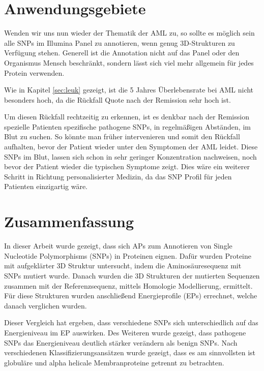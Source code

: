 \section{Anwendungsgebiete}

Wenden wir uns nun wieder der Thematik der \ac{AML} zu, so sollte es möglich sein alle \ac{SNP}s im Illumina Panel zu annotieren, wenn genug 3D-Strukturen zu Verfügung stehen. Generell ist die Annotation nicht auf das Panel oder den Organismus Mensch beschränkt, sondern lässt sich viel mehr allgemein für jedes Protein verwenden.

Wie in Kapitel \ref{sec:leuk} gezeigt, ist die 5 Jahres Überlebensrate bei \ac{AML} nicht besonders hoch, da die Rückfall Quote nach der Remission sehr hoch ist. 

Um diesen Rückfall rechtzeitig zu erkennen, ist es denkbar nach der Remission spezielle Patienten spezifische pathogene \ac{SNP}s, in regelmäßigen Abständen, im Blut zu suchen. So könnte man früher intervenieren und somit den Rückfall aufhalten, bevor der Patient wieder unter den Symptomen der \ac{AML} leidet.
Diese \ac{SNP}s im Blut, lassen sich schon in sehr geringer Konzentration nachweisen, noch bevor der Patient wieder die typischen Symptome zeigt. Dies wäre ein weiterer Schritt in Richtung personalisierter Medizin, da das \ac{SNP} Profil für jeden Patienten einzigartig wäre.




\section{Zusammenfassung}
In dieser Arbeit wurde gezeigt, dass sich \acf{APs} zum Annotieren von Single Nucleotide Polymorphisms (SNPs) in Proteinen eignen. Dafür wurden Proteine mit aufgeklärter 3D Struktur untersucht, indem die Aminosäuresequenz mit \ac{SNP}s mutiert wurde. Danach wurden die 3D Strukturen der mutierten Sequenzen zusammen mit der Referenzsequenz, mittels Homologie Modellierung, ermittelt. Für diese Strukturen wurden anschließend Energieprofile (EPs) errechnet, welche danach verglichen wurden.

Dieser Vergleich hat ergeben, dass verschiedene \ac{SNP}s sich unterschiedlich auf das Energieniveau im \ac{EP} auswirken. Des Weiteren wurde gezeigt, dass pathogene \ac{SNP}s das Energieniveau deutlich stärker verändern als benign \ac{SNP}s. Nach verschiedenen Klassifizierungsansätzen wurde gezeigt, dass es am sinnvollsten ist globuläre und alpha helicale Membranproteine getrennt zu betrachten. 


